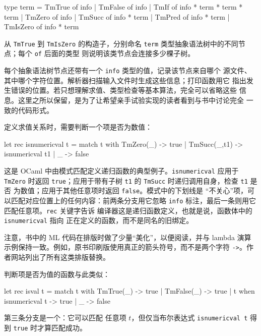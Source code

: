 \begin{taplocamlcode}
type term =
    TmTrue of info
  | TmFalse of info
  | TmIf of info * term * term * term
  | TmZero of info
  | TmSucc of info * term
  | TmPred of info * term
  | TmIsZero of info * term
\end{taplocamlcode}

从 \texttt{TmTrue} 到 \texttt{TmIsZero} 的构造子，分别命名
\texttt{term} 类型抽象语法树中的不同节点；每个 \texttt{of} 后面的类型
则说明该类节点会连接多少棵子树。

每个抽象语法树节点还带有一个 \texttt{info} 类型的值，记录该节点来自哪个
源文件、其中哪个字符位置。解析器扫描输入文件时生成这些信息；打印函数用它
指出发生错误的位置。若只想理解求值、类型检查等基本算法，完全可以省略这些
信息。这里之所以保留，是为了让希望亲手试验实现的读者看到与书中讨论完全
一致的代码形式。

定义求值关系时，需要判断一个项是否为数值：

\begin{taplocamlcode}
let rec isnumericval t = match t with
    TmZero(_) -> true
  | TmSucc(_,t1) -> isnumericval t1
  | _ -> false
\end{taplocamlcode}

这是 OCaml 中由模式匹配定义递归函数的典型例子。\texttt{isnumericval}
应用于 \texttt{TmZero} 时返回 \texttt{true}；应用于带有子树
\texttt{t1} 的 \texttt{TmSucc} 时递归调用自身，检查 \texttt{t1} 是否
为数值；应用于其他任意项时返回 \texttt{false}。模式中的下划线是
“不关心”项，可以匹配对应位置上的任何内容：前两条分支用它忽略
\texttt{info} 标注，最后一条则用它匹配任意项。\texttt{rec} 关键字告诉
编译器这是递归函数定义，也就是说，函数体中的 \texttt{isnumericval} 指向
正在定义的函数，而不是同名的旧绑定。

注意，书中的 ML 代码在排版时做了少量“美化”，以便阅读，并与 lambda 演算
示例保持一致。例如，原书印刷版使用真正的箭头符号，而不是两个字符
\texttt{->}。作者网站列出了所有这类排版替换。

判断项是否为值的函数与此类似：

\begin{taplocamlcode}
let rec isval t = match t with
    TmTrue(_) -> true
  | TmFalse(_) -> true
  | t when isnumericval t -> true
  | _ -> false
\end{taplocamlcode}

第三条分支是一个：它可以匹配
任意项 \(t\)，但仅当布尔表达式 \texttt{isnumericval t} 得到
\texttt{true} 时才算匹配成功。


